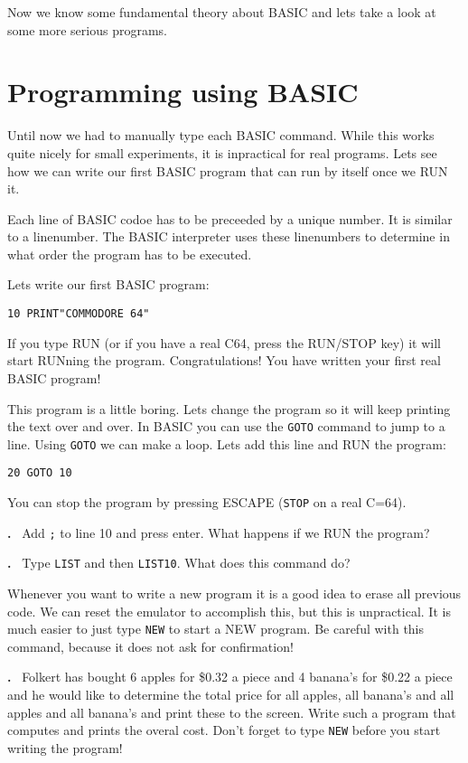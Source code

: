 \documentclass{article}
\newcounter{problem}
\newcounter{solution}
\newcommand\problem{%
  \stepcounter{problem}%
  \textbf{\theproblem.}~%
  \setcounter{solution}{0}%
}
\begin{document}
Now we know some fundamental theory about BASIC and lets take a look at some more serious programs.

\section{Programming using BASIC}

Until now we had to manually type each BASIC command.
While this works quite nicely for small experiments, it is inpractical for real programs.
Lets see how we can write our first BASIC program that can run by itself once we RUN it.

Each line of BASIC codoe has to be preceeded by a unique number.
It is similar to a linenumber.
The BASIC interpreter uses these linenumbers to determine in what order the program has to be executed.

Lets write our first BASIC program:

\begin{lstlisting}
10 PRINT"COMMODORE 64"
\end{lstlisting}

If you type RUN (or if you have a real C64, press the RUN/STOP key) it will start RUNning the program.
Congratulations! You have written your first real BASIC program!

This program is a little boring.
Lets change the program so it will keep printing the text over and over.
In BASIC you can use the \verb:GOTO: command to jump to a line.
Using \verb:GOTO: we can make a loop.
Lets add this line and RUN the program:

\begin{lstlisting}
20 GOTO 10
\end{lstlisting}

You can stop the program by pressing ESCAPE (\verb:STOP: on a real C=64).

\problem Add \verb:;: to line 10 and press enter. What happens if we RUN the program?

\problem Type \verb:LIST: and then \verb:LIST10:. What does this command do?

Whenever you want to write a new program it is a good idea to erase all previous code.
We can reset the emulator to accomplish this, but this is unpractical.
It is much easier to just type \verb:NEW: to start a NEW program.
Be careful with this command, because it does not ask for confirmation!

\problem Folkert has bought 6 apples for \$0.32 a piece and 4 banana's for \$0.22 a piece and he would like to determine the total price for all apples, all banana's and all apples and all banana's and print these to the screen.
Write such a program that computes and prints the overal cost. Don't forget to type \verb:NEW: before you start writing the program!
\end{document}
